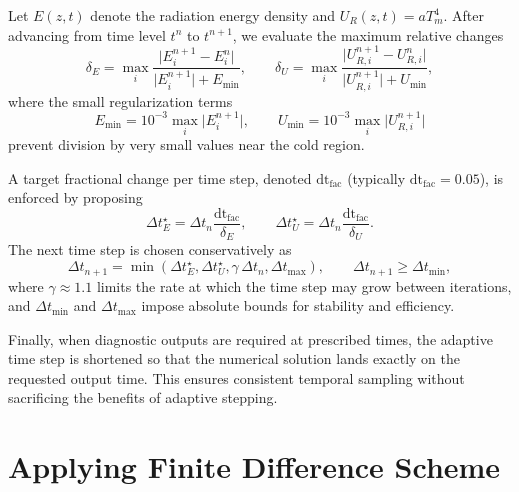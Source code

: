 \documentclass{article}
\begin{document}
Let $E(z,t)$ denote the radiation energy density and $U_R(z,t) = aT_m^4$. After advancing from time level $t^n$ to $t^{n+1}$, we evaluate the maximum relative changes
\begin{equation}
\delta_E = \max_i \frac{\lvert E^{n+1}_i - E^n_i\rvert} {\lvert E^{n+1}_i\rvert + E_{\min}}, \qquad \delta_U = \max_i \frac{\lvert U^{n+1}_{R,i} - U^n_{R,i}\rvert} {\lvert U^{n+1}_{R,i}\rvert + U_{\min}},
\end{equation}
where the small regularization terms
\[E_{\min} = 10^{-3}\max_i \lvert E^{n+1}_i\rvert, \qquad U_{\min} = 10^{-3}\max_i \lvert U^{n+1}_{R,i}\rvert\]
prevent division by very small values near the cold region.

A target fractional change per time step, denoted $\mathrm{dt}_{\mathrm{fac}}$
(typically $\mathrm{dt}_{\mathrm{fac}} = 0.05$), is enforced by proposing
\begin{equation}
\Delta t_E^{\star} = \Delta t_n \frac{\mathrm{dt}_{\mathrm{fac}}}{\delta_E}, \qquad \Delta t_U^{\star} = \Delta t_n \frac{\mathrm{dt}_{\mathrm{fac}}}{\delta_U}.
\end{equation}
The next time step is chosen conservatively as
\begin{equation}
\Delta t_{n+1}
=
\min\!\left( \Delta t_E^{\star}, \Delta t_U^{\star}, \gamma\,\Delta t_n, \Delta t_{\max} \right), \qquad \Delta t_{n+1} \ge \Delta t_{\min},
\end{equation}
where $\gamma \approx 1.1$ limits the rate at which the time step may grow between iterations, and $\Delta t_{\min}$ and $\Delta t_{\max}$ impose absolute bounds for stability and efficiency.

Finally, when diagnostic outputs are required at prescribed times, the adaptive time step is shortened so that the numerical solution lands exactly on the requested output time. This ensures consistent temporal sampling without sacrificing the benefits of adaptive stepping.


\section{Applying Finite Difference Scheme}
\end{document}
